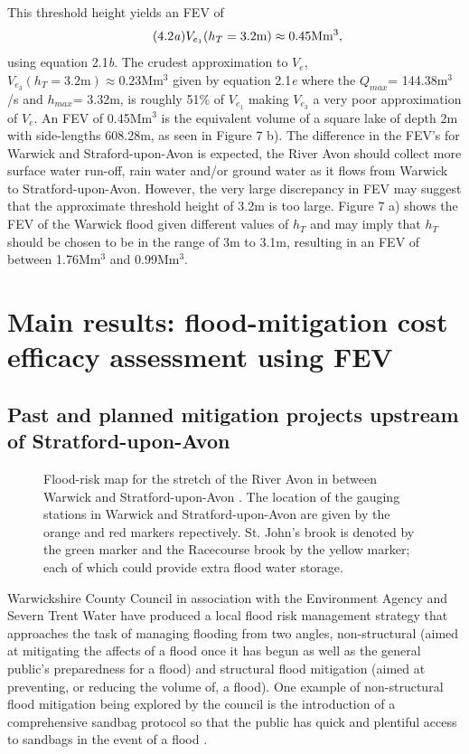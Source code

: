 \documentclass[11pt,a4paper]{article}
\begin{document}
This threshold height yields an FEV of
\begin{equation}\tag{4.2\textit{a}}
V_{e_1}(h_T=\text{3.2m})\approx 0.45\text{Mm$^3$},
\end{equation}
using equation 2.1\textit{b}. The crudest approximation to $V_e$, $V_{e_3}(h_T=\text{3.2m})\approx 0.23\text{Mm$^3$}$ given by equation 2.1\textit{e} where the $Q_{max}$= 144.38m$^3$/s and $h_{max}$= 3.32m, is roughly 51\% of $V_{e_1}$ making $V_{e_3}$ a very poor approximation of $V_e$. An FEV of 0.45Mm$^3$ is the equivalent volume of a square lake of depth 2m with side-lengths 608.28m, as seen in Figure 7 b). The difference in the FEV's for Warwick and Straford-upon-Avon is expected, the River Avon should collect more surface water run-off, rain water and/or ground water as it flows from Warwick to Stratford-upon-Avon. However, the very large discrepancy in FEV may suggest that the approximate threshold height of 3.2m is too large. Figure 7 a) shows the FEV of the Warwick flood given different values of $h_T$ and may imply that $h_T$ should be chosen to be in the range of 3m to 3.1m, resulting in an FEV of between 1.76Mm$^3$ and 0.99Mm$^3$.

\section{Main results: flood-mitigation cost efficacy assessment using FEV}
\subsection{Past and planned mitigation projects upstream of Stratford-upon-Avon}
\begin{figure}[ht!]
\begin{center}
\caption{Flood-risk map for the stretch of the River Avon in between Warwick and Stratford-upon-Avon \cite{flood-risk}. The location of the gauging stations in Warwick and Stratford-upon-Avon are given by the orange and red markers repectively. St. John's brook is denoted by the green marker and the Racecourse brook by the yellow marker{;} each of which could provide extra flood water storage.}
\end{center}
\end{figure}

Warwickshire County Council in association with the Environment Agency and Severn Trent Water have produced a local flood risk management strategy \cite{war1} that approaches the task of managing flooding from two angles, non-structural (aimed at mitigating the affects of a flood once it has begun as well as the general public's preparedness for a flood) and structural flood mitigation (aimed at preventing, or reducing the volume of, a flood). One example of non-structural flood mitigation being explored by the council is the introduction of a comprehensive sandbag protocol so that the public has quick and plentiful access to sandbags in the event of a flood \cite{war1}. 
\end{document}
